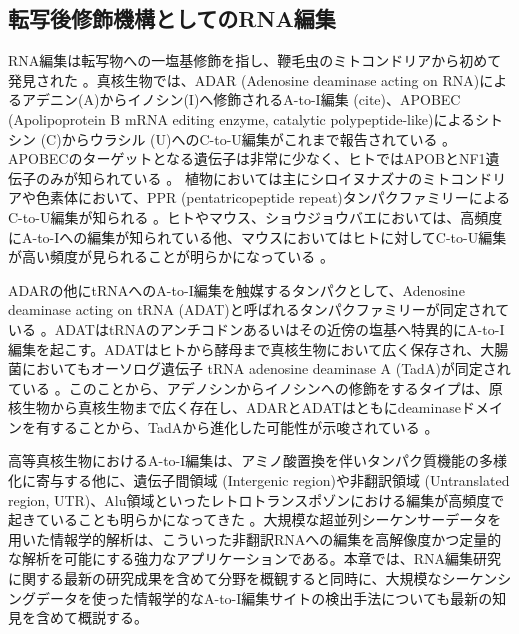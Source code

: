 \subsection{転写後修飾機構としてのRNA編集}
RNA編集は転写物への一塩基修飾を指し、鞭毛虫のミトコンドリアから初めて発見された \citep{BenVanBra8609}。真核生物では、ADAR (Adenosine deaminase acting on RNA)によるアデニン(A)からイノシン(I)へ修飾されるA-to-I編集 (cite)、APOBEC (Apolipoprotein B mRNA editing enzyme, catalytic polypeptide-like)によるシトシン (C)からウラシル (U)へのC-to-U編集がこれまで報告されている \citep{BenVanBra8609}。APOBECのターゲットとなる遺伝子は非常に少なく、ヒトではAPOBとNF1遺伝子のみが知られている \citep{CapFreSku9702}。
植物においては主にシロイヌナズナのミトコンドリアや色素体において、PPR (pentatricopeptide repeat)タンパクファミリーによるC-to-U編集が知られる \citep{Shi0603, MenCheJin10}。ヒトやマウス、ショウジョウバエにおいては、高頻度にA-to-Iへの編集が知られている他、マウスにおいてはヒトに対してC-to-U編集が高い頻度が見られることが明らかになっている \citep{Danecek:2012aa, Gu:2012aa}。
\par
ADARの他にtRNAへのA-to-I編集を触媒するタンパクとして、Adenosine deaminase acting on tRNA (ADAT)と呼ばれるタンパクファミリーが同定されている \citep{MaaGerRic9908}。ADATはtRNAのアンチコドンあるいはその近傍の塩基へ特異的にA-to-I編集を起こす。ADATはヒトから酵母まで真核生物において広く保存され、大腸菌においてもオーソログ遺伝子 tRNA adenosine deaminase A (TadA)が同定されている \citep{WolGerKel0207}。このことから、アデノシンからイノシンへの修飾をするタイプは、原核生物から真核生物まで広く存在し、ADARとADATはともにdeaminaseドメインを有することから、TadAから進化した可能性が示唆されている \citep{GerKel0106}。
\par
高等真核生物におけるA-to-I編集は、アミノ酸置換を伴いタンパク質機能の多様化に寄与する他に、遺伝子間領域 (Intergenic region)や非翻訳領域 (Untranslated region, UTR)、Alu領域といったレトロトランスポゾンにおける編集が高頻度で起きていることも明らかになってきた \citep{Ramaswami:2012aa,Bazak:2013aa}。大規模な超並列シーケンサーデータを用いた情報学的解析は、こういった非翻訳RNAへの編集を高解像度かつ定量的な解析を可能にする強力なアプリケーションである。本章では、RNA編集研究に関する最新の研究成果を含めて分野を概観すると同時に、大規模なシーケンシングデータを使った情報学的なA-to-I編集サイトの検出手法についても最新の知見を含めて概説する。

